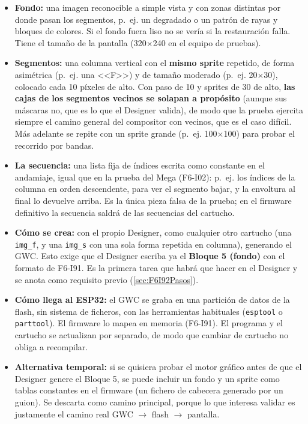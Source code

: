 \begin{itemize}
	\item \textbf{Fondo:} una imagen reconocible a simple vista y con zonas distintas por donde pasan los segmentos, p.~ej. un degradado o un patrón de rayas y bloques de colores. Si el fondo fuera liso no se vería si la restauración falla. Tiene el tamaño de la pantalla (320$\times$240 en el equipo de pruebas).
	\item \textbf{Segmentos:} una columna vertical con el \textbf{mismo sprite} repetido, de forma asimétrica (p.~ej. una <<F>>) y de tamaño moderado (p.~ej. 20$\times$30), colocado cada 10 píxeles de alto. Con paso de 10 y sprites de 30 de alto, \textbf{las cajas de los segmentos vecinos se solapan a propósito} (aunque sus máscaras no, que es lo que el Designer valida), de modo que la prueba ejercita siempre el camino general del compositor con vecinos, que es el caso difícil. Más adelante se repite con un sprite grande (p.~ej. 100$\times$100) para probar el recorrido por bandas.
	\item \textbf{La secuencia:} una lista fija de índices escrita como constante en el andamiaje, igual que en la prueba del Mega (F6-I02): p.~ej. los índices de la columna en orden descendente, para ver el segmento bajar, y la envoltura al final lo devuelve arriba. Es la única pieza falsa de la prueba; en el firmware definitivo la secuencia saldrá de las secuencias del cartucho.
	\item \textbf{Cómo se crea:} con el propio Designer, como cualquier otro cartucho (una \texttt{img\_f}, y una \texttt{img\_s} con una sola forma repetida en columna), generando el GWC. Esto exige que el Designer escriba ya el \textbf{Bloque 5 (fondo)} con el formato de F6-I91. Es la primera tarea que habrá que hacer en el Designer y se anota como requisito previo (\ref{sec:F6I92Pasos}).
	\item \textbf{Cómo llega al ESP32:} el GWC se graba en una partición de datos de la flash, sin sistema de ficheros, con las herramientas habituales (\texttt{esptool} o \texttt{parttool}). El firmware lo mapea en memoria (F6-I91). El programa y el cartucho se actualizan por separado, de modo que cambiar de cartucho no obliga a recompilar.
	\item \textbf{Alternativa temporal:} si se quisiera probar el motor gráfico antes de que el Designer genere el Bloque 5, se puede incluir un fondo y un sprite como tablas constantes en el firmware (un fichero de cabecera generado por un guion). Se descarta como camino principal, porque lo que interesa validar es justamente el camino real GWC $\rightarrow$ flash $\rightarrow$ pantalla.
\end{itemize}

